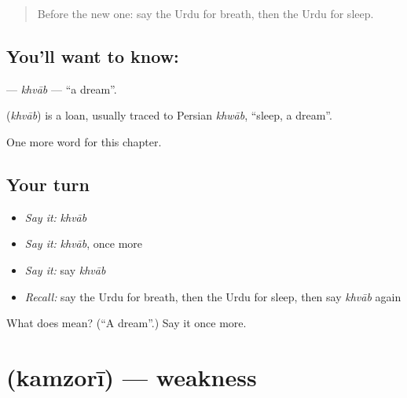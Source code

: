\label{lesson:UR-C216-khvab}



\begin{quote}
Before the new one: say the Urdu for breath, then the Urdu for sleep.
\end{quote}

\subsection*{You'll want to know: }
\textbf{} — \emph{khvāb} — \textquotedblleft{}a dream\textquotedblright{}.

\begin{cousinweb}
\textbf{} (\emph{khvāb}) is a loan, usually traced to Persian \emph{khwāb}, \textquotedblleft{}sleep, a dream\textquotedblright{}.
\end{cousinweb}

\begin{grammarlens}[title={What you've built}]
One more word for this chapter.
\end{grammarlens}

\subsection*{Your turn}
\begin{itemize}
\raggedright
  \item \emph{Say it:} \emph{khvāb}
  \item \emph{Say it:} \emph{khvāb}, once more
  \item \emph{Say it:} say \emph{khvāb}
  \item \emph{Recall:} say the Urdu for breath, then the Urdu for sleep, then say \emph{khvāb} again
\end{itemize}

\begin{tcolorbox}[breakable,colback=teal!4,colframe=teal!35!black,title={Before you move on}]
What does  mean? (\textquotedblleft{}A dream\textquotedblright{}.) Say it once more.
\end{tcolorbox}
\section[\texorpdfstring{\ur{کمزوری} (kamzorī)}{کمزوری (kamzorī)}]{ (kamzorī) — weakness}

\label{lesson:UR-C216-kamzori}



